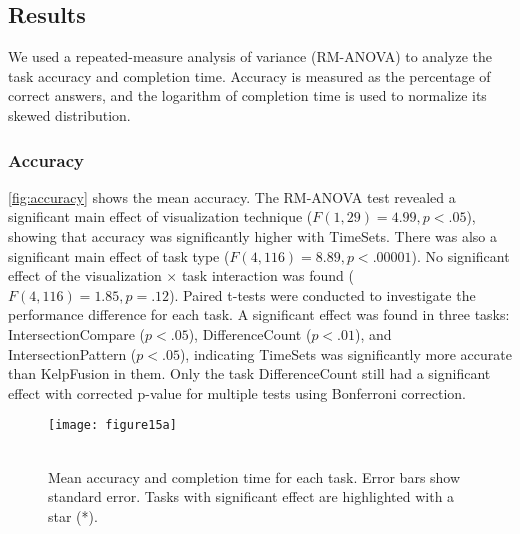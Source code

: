 \subsection{Results}
We used a repeated-measure analysis of variance (RM-ANOVA) to analyze the task accuracy and completion time. Accuracy is measured as the percentage of correct answers, and the logarithm of completion time is used to normalize its skewed distribution.

\subsubsection{Accuracy}
\autoref{fig:accuracy} shows the mean accuracy. The RM-ANOVA test revealed a significant main effect of visualization technique ($F(1,29)=4.99, p<.05$), showing that accuracy was significantly higher with TimeSets. There was also a significant main effect of task type ($F(4,116)=8.89, p<.00001$). No significant effect of the visualization $\times$ task interaction was found ($F(4,116)=1.85, p=.12$). Paired t-tests were conducted to investigate the performance difference for each task. A significant effect was found in three tasks: IntersectionCompare ($p<.05$), DifferenceCount ($p<.01$), and IntersectionPattern ($p<.05$), indicating TimeSets was significantly more accurate than KelpFusion in them. Only the task DifferenceCount still had a significant effect with corrected p-value for multiple tests using Bonferroni correction.

\begin{figure}
	\centering
	 {\texttt{[image: figure15a]}} \\
	\\
	\caption[Mean accuracy and completion time for each task]{Mean accuracy and completion time for each task. Error bars show standard error. Tasks with significant effect are highlighted with a star (*).}
\end{figure}

